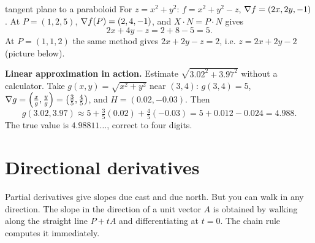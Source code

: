 \begin{example}{tangent plane to a paraboloid}
For $z=x^2+y^2$: $f=x^2+y^2-z$, $\nabla f=(2x,2y,-1)$. At $P=(1,2,5)$,
$\nabla f(P)=(2,4,-1)$, and $X\cdot N=P\cdot N$ gives
\[ 2x+4y-z=2+8-5=5 . \]
At $P=(1,1,2)$ the same method gives $2x+2y-z=2$, i.e. $z=2x+2y-2$ (picture below).
\end{example}

\begin{center}
\end{center}

\begin{extra}
\textbf{Linear approximation in action.} Estimate $\sqrt{3.02^2+3.97^2}$ without a calculator.
Take $g(x,y)=\sqrt{x^2+y^2}$ near $(3,4)$: $g(3,4)=5$, $\nabla g=\left(\frac xg,\frac yg\right)=\left(\frac35,\frac45\right)$,
and $H=(0.02,-0.03)$. Then
\[
g(3.02,3.97)\approx5+\tfrac35(0.02)+\tfrac45(-0.03)=5+0.012-0.024=4.988 .
\]
The true value is $4.98811\ldots$, correct to four digits.
\end{extra}

\section{Directional derivatives}

\begin{intuition}
Partial derivatives give slopes due east and due north. But you can walk in any direction.
The slope in the direction of a unit vector $A$ is obtained by walking along the straight
line $P+tA$ and differentiating at $t=0$. The chain rule computes it immediately.
\end{intuition}

